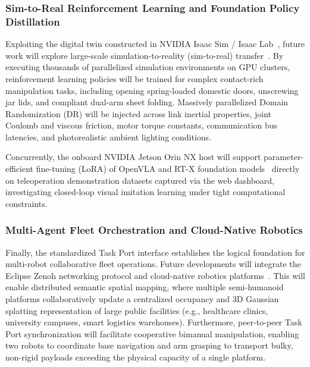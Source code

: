 \subsubsection{Sim-to-Real Reinforcement Learning and Foundation Policy Distillation}
Exploiting the digital twin constructed in NVIDIA Isaac Sim / Isaac Lab~\cite{isaaclab}, future work will explore large-scale simulation-to-reality (sim-to-real) transfer~\cite{tobin2017domain,peng2018simtoreal}. By executing thousands of parallelized simulation environments on GPU clusters, reinforcement learning policies will be trained for complex contact-rich manipulation tasks, including opening spring-loaded domestic doors, unscrewing jar lids, and compliant dual-arm sheet folding. Massively parallelized Domain Randomization (DR) will be injected across link inertial properties, joint Coulomb and viscous friction, motor torque constants, communication bus latencies, and photorealistic ambient lighting conditions. 

Concurrently, the onboard NVIDIA Jetson Orin NX host will support parameter-efficient fine-tuning (LoRA) of OpenVLA and RT-X foundation models~\cite{openvla,rtx} directly on teleoperation demonstration datasets captured via the web dashboard, investigating closed-loop visual imitation learning under tight computational constraints.

\subsubsection{Multi-Agent Fleet Orchestration and Cloud-Native Robotics}
Finally, the standardized Task Port interface establishes the logical foundation for multi-robot collaborative fleet operations. Future developments will integrate the Eclipse Zenoh networking protocol and cloud-native robotics platforms~\cite{zenoh2023}. This will enable distributed semantic spatial mapping, where multiple semi-humanoid platforms collaboratively update a centralized occupancy and 3D Gaussian splatting representation of large public facilities (e.g., healthcare clinics, university campuses, smart logistics warehouses). Furthermore, peer-to-peer Task Port synchronization will facilitate cooperative bimanual manipulation, enabling two robots to coordinate base navigation and arm grasping to transport bulky, non-rigid payloads exceeding the physical capacity of a single platform.
